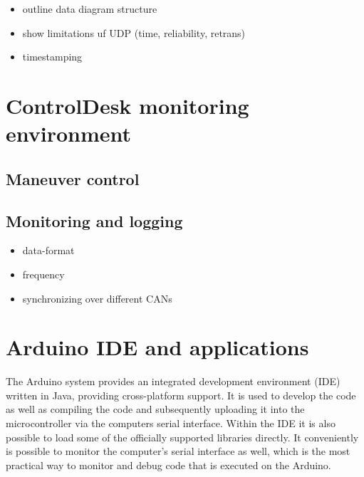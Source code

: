 \documentclass[ExampleMasters.tex]{subfiles}
\begin{document}
\begin{itemize}
	\item outline data diagram structure
	\item show limitations uf UDP (time, reliability, retrans)
	\item timestamping
	
	
\end{itemize}


\section{ControlDesk monitoring environment}
\label{sec:control_desk}
\subsection{Maneuver control}


\subsection{Monitoring and logging}
\begin{itemize}
	\item data-format
	\item frequency
	\item synchronizing over different CANs	
\end{itemize}


\section{Arduino IDE and applications}
\label{sec:arduino_applications}

The Arduino system provides an integrated development environment (IDE)  written in Java, providing cross-platform support. It is used to develop the code as well as compiling the code and subsequently uploading it into the microcontroller via the computers serial interface. Within the IDE it is also possible to load some of the officially supported libraries directly. It conveniently is possible to monitor the computer's serial interface as well, which is the most practical way to monitor and debug code that is executed on the Arduino. 
\end{document}
